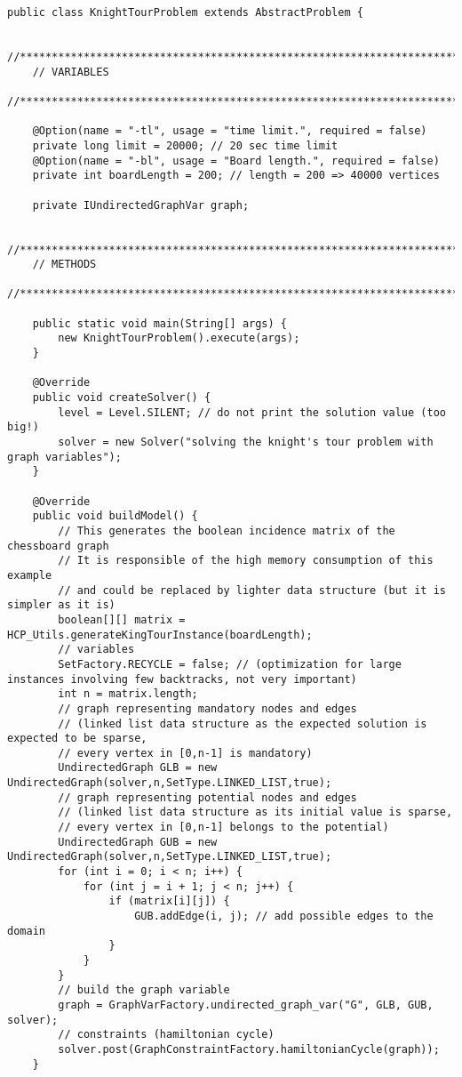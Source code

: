 \documentclass{article}
\begin{document}
\begin{lstlisting}
public class KnightTourProblem extends AbstractProblem {

	//***********************************************************************************
	// VARIABLES
	//***********************************************************************************

	@Option(name = "-tl", usage = "time limit.", required = false)
	private long limit = 20000; // 20 sec time limit
	@Option(name = "-bl", usage = "Board length.", required = false)
	private int boardLength = 200; // length = 200 => 40000 vertices

	private IUndirectedGraphVar graph;

	//***********************************************************************************
	// METHODS
	//***********************************************************************************

	public static void main(String[] args) {
		new KnightTourProblem().execute(args);
	}

	@Override
	public void createSolver() {
		level = Level.SILENT; // do not print the solution value (too big!)
		solver = new Solver("solving the knight's tour problem with graph variables");
	}

	@Override
	public void buildModel() {
		// This generates the boolean incidence matrix of the chessboard graph
		// It is responsible of the high memory consumption of this example 
		// and could be replaced by lighter data structure (but it is simpler as it is)
		boolean[][] matrix = HCP_Utils.generateKingTourInstance(boardLength);
		// variables
		SetFactory.RECYCLE = false; // (optimization for large instances involving few backtracks, not very important)
		int n = matrix.length;
		// graph representing mandatory nodes and edges 
		// (linked list data structure as the expected solution is expected to be sparse, 
		// every vertex in [0,n-1] is mandatory)
		UndirectedGraph GLB = new UndirectedGraph(solver,n,SetType.LINKED_LIST,true);
		// graph representing potential nodes and edges 
		// (linked list data structure as its initial value is sparse, 
		// every vertex in [0,n-1] belongs to the potential)
		UndirectedGraph GUB = new UndirectedGraph(solver,n,SetType.LINKED_LIST,true);
		for (int i = 0; i < n; i++) {
			for (int j = i + 1; j < n; j++) {
				if (matrix[i][j]) {
					GUB.addEdge(i, j); // add possible edges to the domain
				}
			}
		}
		// build the graph variable 
		graph = GraphVarFactory.undirected_graph_var("G", GLB, GUB, solver);
		// constraints (hamiltonian cycle)
		solver.post(GraphConstraintFactory.hamiltonianCycle(graph));
	}


\end{lstlisting}
\end{document}

